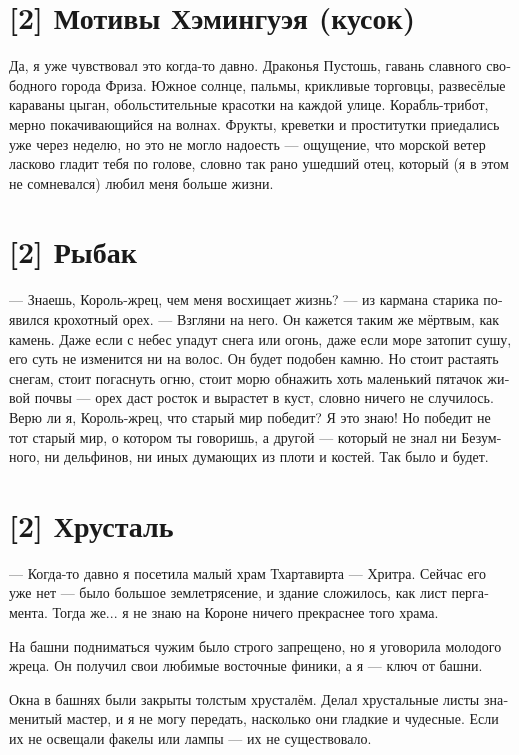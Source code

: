 \documentclass[a4paper,12pt,fleqn]{book}\usepackage{cooltooltips}\usepackage{polyglossia}\setdefaultlanguage[babelshorthands=true]{russian}\setotherlanguage{english}\defaultfontfeatures{Ligatures=TeX,Mapping=tex-text} \usepackage{xcolor}\definecolor{lightgray}{HTML}{bbbbbb}\color{lightgray}\newcommand{\ml}[3]{\textenglish{\textcolor{black}{#3}}}
\begin{document}
{\section{[2] Мотивы Хэмингуэя (кусок)}

Да, я уже чувствовал это когда-то давно.
Драконья Пустошь, гавань славного свободного города Фриза.
Южное солнце, пальмы, крикливые торговцы, развесёлые караваны цыган, обольстительные красотки на каждой улице.
Корабль-трибот, мерно покачивающийся на волнах.
Фрукты, креветки и проститутки приедались уже через неделю, но это не могло надоесть --- ощущение, что морской ветер ласково гладит тебя по голове, словно так рано ушедший отец, который (я в этом не сомневался) любил меня больше жизни.

\section{[2] Рыбак}

--- Знаешь, Король-жрец, чем меня восхищает жизнь? --- из кармана старика появился крохотный орех.
--- Взгляни на него.
Он кажется таким же мёртвым, как камень.
Даже если с небес упадут снега или огонь, даже если море затопит сушу, его суть не изменится ни на волос.
Он будет подобен камню.
Но стоит растаять снегам, стоит погаснуть огню, стоит морю обнажить хоть маленький пятачок живой почвы --- орех даст росток и вырастет в куст, словно ничего не случилось.
Верю ли я, Король-жрец, что старый мир победит?
Я это знаю!
Но победит не тот старый мир, о котором ты говоришь, а другой --- который не знал ни Безумного, ни дельфинов, ни иных думающих из плоти и костей.
Так было и будет.

\section{[2] Хрусталь}

--- Когда-то давно я посетила малый храм Тхартавирта --- Хритра.
Сейчас его уже нет --- было большое землетрясение, и здание сложилось, как лист пергамента.
Тогда же... я не знаю на Короне ничего прекраснее того храма.

На башни подниматься чужим было строго запрещено, но я уговорила молодого жреца.
Он получил свои любимые восточные финики, а я --- ключ от башни.

Окна в башнях были закрыты толстым хрусталём.
Делал хрустальные листы знаменитый мастер, и я не могу передать, насколько они гладкие и чудесные.
Если их не освещали факелы или лампы --- их не существовало.

}
\end{document}
